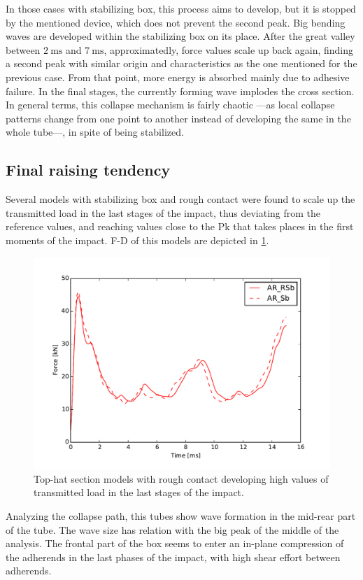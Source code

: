 \documentclass[
documentsize = a4, %
font = cmr, %
typesize = 11, %
printmode = true,
onehalfspacing = true,
language = en, %
titlepage = udciccp, %
degree = pt, %
dedication = true,
acknowledgements = true,
abstract-en = true,
abstract-es = false,
abstract-ga = false,
epigraphs = true,
toc = true,
lof = true,
lot = true,
frontmatterintoc = false,
notation = false,
minimal = false,
]{UDCthesis}
\begin{document}
In those cases with stabilizing box, this process aims to develop, but it is stopped by the mentioned device, which does not prevent the second peak. Big bending waves are developed within the stabilizing box on its place. After the great valley between $\SI{2}{\ms}$ and $\SI{7}{\ms}$, approximatedly, force values scale up back again, finding a second peak with similar origin and characteristics as the one mentioned for the previous case. From that point, more energy is absorbed mainly due to adhesive failure. In the final stages, the currently forming wave implodes the cross section. In general terms, this collapse mechanism is fairly chaotic ---as local collapse patterns change from one point to another instead of developing the same in the whole tube---, in spite of being stabilized.

\subsection{Final raising tendency}
\label{sec:final_tendency}

Several models with stabilizing box and rough contact were found to scale up the transmitted load in the last stages of the impact, thus deviating from the reference values, and reaching values close to the \acrlong{Pk} that takes places in the first moments of the impact. \Gls{F-D} of this models are depicted in \cref{fig:AR_Sb}.

\begin{figure}
	\centering
	\includegraphics[width=0.7\linewidth]{IMG_CUTRES/AR_Sb}
	\caption{Top-hat section models with rough contact developing high values of transmitted load in the last stages of the impact.}
	\label{fig:AR_Sb}
\end{figure}

Analyzing the collapse path, this tubes show wave formation in the mid-rear part of the tube. The wave size has relation with the big peak of the middle of the analysis. The frontal part of the box seems to enter an in-plane compression of the adherends in the last phases of the impact, with high shear effort between adherends.
\end{document}

